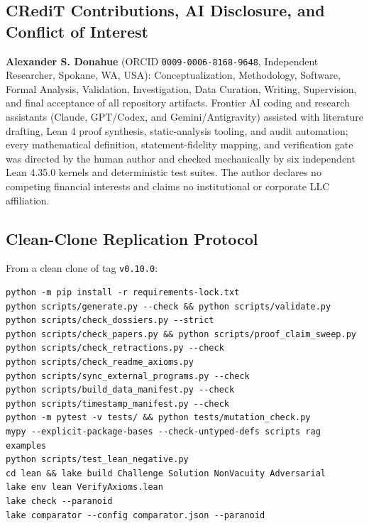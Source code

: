 \documentclass[11pt,reqno]{amsart}
\theoremstyle{plain}
\theoremstyle{definition}
\newcommand{\code}[1]{{\upshape\nolinkurl{#1}}}
\begin{document}
\subsection{CRediT Contributions, AI Disclosure, and Conflict of Interest}
\textbf{Alexander S. Donahue} (ORCID \code{0009-0006-8168-9648}, Independent Researcher,
Spokane, WA, USA): Conceptualization, Methodology, Software, Formal Analysis, Validation,
Investigation, Data Curation, Writing, Supervision, and final acceptance of all repository
artifacts. Frontier AI coding and research assistants (Claude, GPT/Codex, and Gemini/Antigravity)
assisted with literature drafting, Lean 4 proof synthesis, static-analysis tooling, and audit
automation; every mathematical definition, statement-fidelity mapping, and verification gate was
directed by the human author and checked mechanically by six independent Lean 4.35.0 kernels and
deterministic test suites. The author declares no competing financial interests and claims no
institutional or corporate LLC affiliation.

\subsection{Clean-Clone Replication Protocol}
From a clean clone of tag \texttt{v0.10.0}:
{\small
\begin{verbatim}
python -m pip install -r requirements-lock.txt
python scripts/generate.py --check && python scripts/validate.py
python scripts/check_dossiers.py --strict
python scripts/check_papers.py && python scripts/proof_claim_sweep.py
python scripts/check_retractions.py --check
python scripts/check_readme_axioms.py
python scripts/sync_external_programs.py --check
python scripts/build_data_manifest.py --check
python scripts/timestamp_manifest.py --check
python -m pytest -v tests/ && python tests/mutation_check.py
mypy --explicit-package-bases --check-untyped-defs scripts rag examples
python scripts/test_lean_negative.py
cd lean && lake build Challenge Solution NonVacuity Adversarial
lake env lean VerifyAxioms.lean
lake check --paranoid
lake comparator --config comparator.json --paranoid
\end{verbatim}
}



\end{document}
